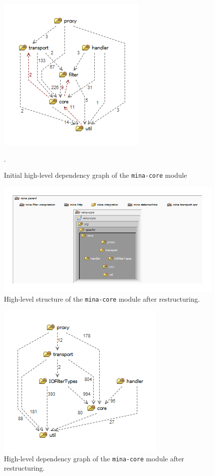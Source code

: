 \begin{figure}[H]
    \centering
    \includegraphics{images/MINA_core_initial_dependencies.png}
    \caption{Initial high-level dependency graph of the \texttt{mina-core} module}.
    \label{fig:mina_core_dependencies_initial}
\end{figure}

\begin{figure}[H]
    \centering
    \includegraphics[width=\textwidth]{images/MINA_core_restructure.png}
    \caption{High-level structure of the \texttt{mina-core} module after restructuring.}
    \label{fig:mina_core_restructured}
\end{figure}

\begin{figure}[H]
    \centering
    \includegraphics{images/MINA_core_dependencies_restructure.png}
    \caption{High-level dependency graph of the \texttt{mina-core} module after restructuring.}
    \label{fig:mina_core_dependencies_restructured}
\end{figure}

